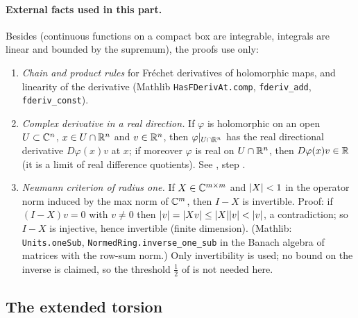 \paragraph{External facts used in this part.} Besides  (continuous functions on a compact
box are integrable, integrals are linear and bounded by the supremum), the proofs use only:
\begin{enumerate}[label=(X\arabic*),ref=(X\arabic*)]
\item\label{bpI:p1:ext-chain} \emph{Chain and product rules} for Fr\'echet derivatives of holomorphic maps, and
  linearity of the derivative (Mathlib \nolinkurl{HasFDerivAt.comp}, \nolinkurl{fderiv_add}, \nolinkurl{fderiv_const}).
\item\label{bpI:p1:ext-real-direction} \emph{Complex derivative in a real direction.} If $\varphi$ is
  holomorphic on an open $U\subset\mathbb{C}^n$, $x\in U\cap\mathbb{R}^n$ and $v\in\mathbb{R}^n$, then $\varphi|_{U\cap\mathbb{R}^n}$ has the
  real directional derivative $D\varphi(x)v$ at $x$; if moreover $\varphi$ is real on $U\cap\mathbb{R}^n$, then
  $D\varphi(x)v\in\mathbb{R}$ (it is a limit of real difference quotients). See ,
  step .
\item\label{bpI:p1:ext-neumann} \emph{Neumann criterion of radius one.} If $X\in\mathbb{C}^{m\times m}$ and $\lvert X\rvert<1$ in the operator norm
  induced by the max norm of $\mathbb{C}^m$, then $I-X$ is invertible. Proof: if $(I-X)v=0$ with $v\ne0$ then $\lvert v\rvert=\lvert Xv\rvert\le\lvert X\rvert\lvert v\rvert<\lvert v\rvert$, a
  contradiction; so $I-X$ is injective, hence invertible (finite dimension). (Mathlib: \nolinkurl{Units.oneSub}, \nolinkurl{NormedRing.inverse_one_sub}
  in the Banach algebra of matrices with the row-sum norm.) Only invertibility is used; no bound on the inverse is claimed, so the threshold
  $\frac12$ of  is not needed here.
\end{enumerate}

\subsection{The extended torsion}\label{bpI:p1:sec-extended}

